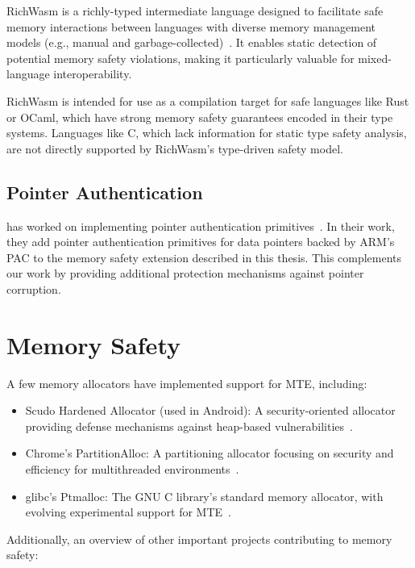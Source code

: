 RichWasm is a richly-typed intermediate language designed to facilitate safe memory interactions between languages with diverse memory management models (e.g., manual and garbage-collected)~\cite{paraskevopoulou2024richwasm}.
It enables static detection of potential memory safety violations, making it particularly valuable for mixed-language interoperability.

RichWasm is intended for use as a compilation target for safe languages like Rust or OCaml, which have strong memory safety guarantees encoded in their type systems.
Languages like C, which lack information for static type safety analysis, are not directly supported by RichWasm's type-driven safety model.

\subsection{Pointer Authentication}
\label{subsec:related-pointer-authentication}

\citeauthor*{rehde2023wasm} has worked on implementing pointer authentication primitives~\cite{rehde2023wasm}.
In their work, they add pointer authentication primitives for data pointers backed by ARM's \ac{PAC} to the memory safety extension described in this thesis.
This complements our work by providing additional protection mechanisms against pointer corruption.

\section{Memory Safety}
\label{sec:related-memory-safety}

A few memory allocators have implemented support for \ac{MTE}, including:

\begin{itemize}
    \item Scudo Hardened Allocator (used in Android): A security-oriented allocator providing defense mechanisms against heap-based vulnerabilities~\cite{scudo_allocator}.
    \item Chrome's PartitionAlloc: A partitioning allocator focusing on security and efficiency for multithreaded environments~\cite{chrome_partition_alloc}.
    \item glibc's Ptmalloc: The GNU C library's standard memory allocator, with evolving experimental support for \ac{MTE}~\cite{glibc_ptmalloc}.
\end{itemize}

Additionally, an overview of other important projects contributing to memory safety:

